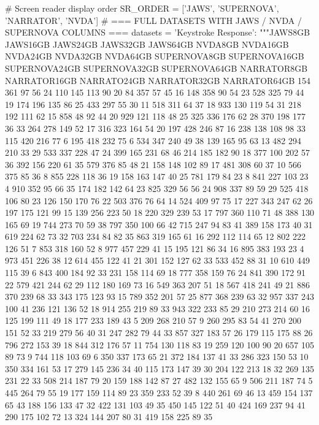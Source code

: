 \begin{pyverbatim}
	# Screen reader display order
	SR_ORDER = ['JAWS', 'SUPERNOVA', 'NARRATOR', 'NVDA']
	# === FULL DATASETS WITH JAWS / NVDA / SUPERNOVA COLUMNS ===
	datasets = {
	'Keystroke Response': """JAWS8GB	JAWS16GB	JAWS24GB	JAWS32GB	JAWS64GB	NVDA8GB	NVDA16GB	NVDA24GB	NVDA32GB	NVDA64GB	SUPERNOVA8GB	SUPERNOVA16GB	SUPERNOVA24GB	SUPERNOVA32GB	SUPERNOVA64GB	NARRATOR8GB	NARRATOR16GB	NARRATO24GB	NARRATOR32GB	NARRATOR64GB
	154	361	97	56	24	110	145	113	90	20	84	357	57	45	16	148	358	90	54	23
	528	325	79	44	19	174	196	135	86	25	433	297	55	30	11	518	311	64	37	18
	933	130	119	54	31	218	192	111	62	15	858	48	92	44	20	929	121	118	48	25
	325	336	176	62	28	370	198	177	36	33	264	278	149	52	17	316	323	164	54	20
	197	428	246	87	16	238	138	108	98	33	115	420	216	77	6	195	418	232	75	6
	534	347	240	49	38	139	165	95	63	13	482	294	210	33	29	533	337	228	47	24
	399	165	231	68	46	214	185	182	90	18	377	100	202	57	36	392	156	220	61	35
	579	376	85	48	21	158	148	102	89	17	481	308	60	37	10	566	375	85	36	8
	855	228	118	36	19	158	163	147	40	25	781	179	84	23	8	841	227	103	23	4
	910	352	95	66	35	174	182	142	64	23	825	329	56	56	24	908	337	89	59	29
	525	418	106	80	23	126	150	170	76	22	503	376	76	64	14	524	409	97	75	17
	227	343	247	62	26	197	175	121	99	15	139	256	223	50	18	220	329	239	53	17
	797	360	110	71	48	388	130	165	69	19	744	273	70	59	38	797	350	100	66	42
	715	247	94	83	41	389	158	173	40	31	619	224	62	73	32	703	234	84	82	35
	863	319	165	61	16	292	112	114	65	12	802	222	126	51	7	853	318	160	52	8
	977	457	229	41	15	195	121	86	34	16	895	383	193	23	4	973	451	226	38	12
	614	455	122	41	21	301	152	127	62	33	533	452	88	31	10	610	449	115	39	6
	843	400	184	92	33	231	158	114	69	18	777	358	159	76	24	841	390	172	91	22
	579	421	244	62	29	112	180	169	73	16	549	363	207	51	18	567	418	241	49	21
	886	370	239	68	33	343	175	123	93	15	789	352	201	57	25	877	368	239	63	32
	957	337	243	100	41	236	121	136	52	18	914	255	219	89	33	943	322	233	85	29
	210	273	214	60	16	125	199	111	49	18	177	233	189	43	5	209	268	210	57	9
	260	295	83	54	41	270	200	151	52	33	219	279	56	40	31	247	282	79	44	33
	857	327	183	57	26	179	115	175	88	26	796	272	153	39	18	844	312	176	57	11
	754	130	118	83	19	259	120	100	90	20	657	105	89	73	9	744	118	103	69	6
	350	337	173	65	21	372	184	137	41	33	286	323	150	53	10	350	334	161	53	17
	279	145	236	34	40	115	173	147	39	30	204	122	213	18	32	269	135	231	22	33
	508	214	187	79	20	159	188	142	87	27	482	132	155	65	9	506	211	187	74	5
	445	264	79	55	19	177	159	114	89	23	359	233	52	39	8	440	261	69	46	13
	459	154	137	65	43	188	156	133	47	32	422	131	103	49	35	450	145	122	51	40
	424	169	237	94	41	290	175	102	72	13	324	144	207	80	31	419	158	225	89	35
}
\end{pyverbatim}
